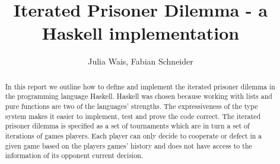 \documentclass[]{article}
\title{Iterated Prisoner Dilemma - a Haskell implementation}
\author{Julia Wais, Fabian Schneider}
\begin{document}
\maketitle

\begin{abstract}
In this report we outline how to define and implement the iterated prisoner dilemma in the programming language Haskell.
Haskell was chosen because working with lists and pure functions are two of the languages' strengths. The expressiveness of the type system makes it easier to implement, test and prove the code correct.
The iterated prisoner dilemma is specified as a set of tournaments which are in turn a set of iterations of games players.
Each player can only decide to cooperate or defect in a given game based on the players games' history and does not have access to the information of its opponent current decision.
\end{abstract}
\end{document}
